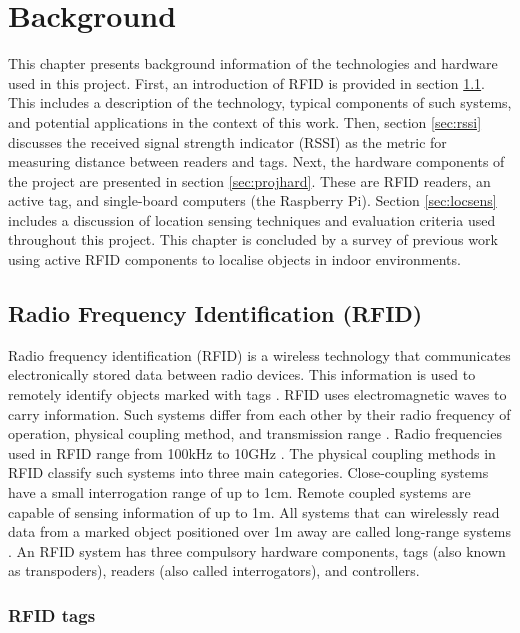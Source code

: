 \chapter{Background}
\label{ch:background}

This chapter presents background information of the technologies and hardware used in this project. First, an introduction of RFID is provided in section \ref{sec:rfid}. This includes a description of the technology, typical components of such systems, and potential applications in the context of this work. Then, section \ref{sec:rssi} discusses the received signal strength indicator (RSSI) as the metric for measuring distance between readers and tags. Next, the hardware components of the project are presented in section \ref{sec:projhard}. These are RFID readers, an active tag, and single-board computers (the Raspberry Pi). Section \ref{sec:locsens} includes a discussion of location sensing techniques and evaluation criteria used throughout this project. This chapter is concluded by a survey of previous work using active RFID components to localise objects in indoor environments.

\section{Radio Frequency Identification (RFID)}
\label{sec:rfid}

Radio frequency identification (RFID) is a wireless technology that communicates electronically stored data between radio devices. This information is used to remotely identify objects marked with tags \cite[p. 5]{Hunt2007}. RFID uses electromagnetic waves to carry information. Such systems differ from each other by their radio frequency of operation, physical coupling method, and transmission range \cite[p. 21]{Finkenzeller2010}. Radio frequencies used in RFID range from 100kHz to 10GHz \cite{Landt2005}. The physical coupling methods in RFID classify such systems into three main categories. Close-coupling systems have a small interrogation range of up to 1cm. Remote coupled systems are capable of sensing information of up to 1m. All systems that can wirelessly read data from a marked object positioned over 1m away are called long-range systems \cite[p. 22]{Finkenzeller2010}. An RFID system has three compulsory hardware components, tags (also known as transpoders), readers (also called interrogators), and controllers.

\subsection{RFID tags}

